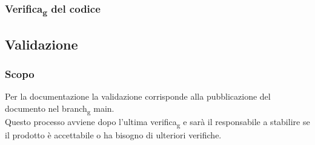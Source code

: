         \subsubsection{Verifica\textsubscript{g} del codice}
    
    \subsection{Validazione}
        \subsubsection{Scopo}
        Per la documentazione la validazione corrisponde alla pubblicazione del documento nel branch\textsubscript{g} main.\\
        Questo processo avviene dopo l'ultima verifica\textsubscript{g} e sarà il responsabile a stabilire se il prodotto è accettabile o ha bisogno di
        ulteriori verifiche.
